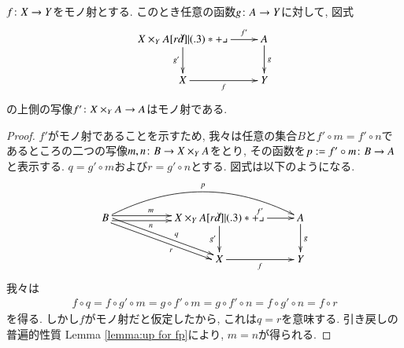 \begin{proposition}\label{prop:pb preserve mono}


$f\colon X\rightarrow Y$をモノ射とする. このとき任意の函数$g\colon A\rightarrow Y$に対して, 図式
$$
\xymatrix{X\times_YA\ar[r]^-{f'}\ar[d]_{g'}\ullimit&A\ar[d]^g\\X\ar[r]_f&Y}
$$
の上側の写像$f'\colon X\times_YA\rightarrow A$はモノ射である.

\end{proposition}

\begin{proof}


$f'$がモノ射であることを示すため, 我々は任意の集合$B$と$f'\circ m=f'\circ n$であるところの二つの写像$m,n\colon B\rightarrow X\times_YA$をとり, その函数を$p:=f'\circ m\colon B\rightarrow A$と表示する. $q=g'\circ m$および$r=g'\circ n$とする. 図式は以下のようになる.
$$
\xymatrix{B\ar@<.5ex>[rr]^(.4)m\ar@<-.5ex>[rr]_(.4)n\ar@/^2pc/[rrr]^p\ar@<.5ex>[drr]^(.6)q\ar@<-.5ex>[drr]_(.6)r&&X\times_YA\ar[r]^{f'}\ar[d]_{g'}\ullimit&A\ar[d]^g\\&&X\ar[r]_f&Y}
$$
我々は
\begin{align*}f\circ q=f\circ g'\circ m=g\circ f'\circ m=g\circ f'\circ n=f\circ g'\circ n=f\circ r\end{align*}
を得る. しかし$f$がモノ射だと仮定したから, これは$q=r$を意味する. 引き戻しの普遍的性質 Lemma \ref{lemma:up for fp}により, $m=n$が得られる.

\end{proof}

